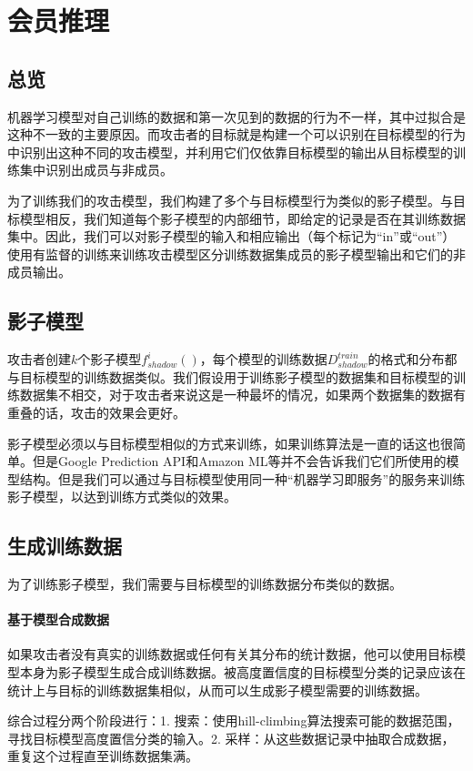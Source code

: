 \documentclass[a4paper]{article}
\begin{document}
\section{会员推理}

\subsection{总览}
机器学习模型对自己训练的数据和第一次见到的数据的行为不一样，其中过拟合是这种不一致的主要原因。而攻击者的目标就是构建一个可以识别在目标模型的行为中识别出这种不同的攻击模型，并利用它们仅依靠目标模型的输出从目标模型的训练集中识别出成员与非成员。

为了训练我们的攻击模型，我们构建了多个与目标模型行为类似的影子模型。与目标模型相反，我们知道每个影子模型的内部细节，即给定的记录是否在其训练数据集中。因此，我们可以对影子模型的输入和相应输出（每个标记为“in”或“out”）使用有监督的训练来训练攻击模型区分训练数据集成员的影子模型输出和它们的非成员输出。

\subsection{影子模型}
攻击者创建$k$个影子模型$f_{shadow}^i()$，每个模型的训练数据$D_{shadow}^{train}$的格式和分布都与目标模型的训练数据类似。我们假设用于训练影子模型的数据集和目标模型的训练数据集不相交，对于攻击者来说这是一种最坏的情况，如果两个数据集的数据有重叠的话，攻击的效果会更好。

影子模型必须以与目标模型相似的方式来训练，如果训练算法是一直的话这也很简单。但是Google Prediction API和Amazon ML等并不会告诉我们它们所使用的模型结构。但是我们可以通过与目标模型使用同一种“机器学习即服务”的服务来训练影子模型，以达到训练方式类似的效果。

\subsection{生成训练数据}
为了训练影子模型，我们需要与目标模型的训练数据分布类似的数据。

\paragraph{基于模型合成数据}
如果攻击者没有真实的训练数据或任何有关其分布的统计数据，他可以使用目标模型本身为影子模型生成合成训练数据。被高度置信度的目标模型分类的记录应该在统计上与目标的训练数据集相似，从而可以生成影子模型需要的训练数据。

综合过程分两个阶段进行：1. 搜索：使用hill-climbing算法搜索可能的数据范围，寻找目标模型高度置信分类的输入。2. 采样：从这些数据记录中抽取合成数据，重复这个过程直至训练数据集满。
\end{document}

